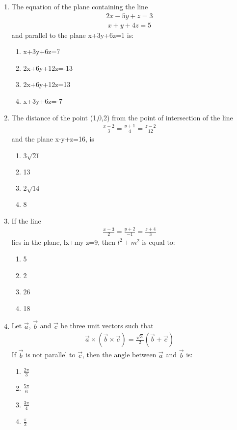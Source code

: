 \begin{enumerate}[label=\arabic*.,ref=\thesubsection.\theenumi]
\item The equation of the plane containing the line
\begin{align*}
2x-5y+z=3
\end{align*}
\begin{align*}
x+y+4z=5
\end{align*}
and parallel to the plane x+3y+6z=1 is:
\begin{enumerate}
\item x+3y+6z=7
\item 2x+6y+12z=-13
\item 2x+6y+12z=13
\item x+3y+6z=-7
\end{enumerate}

\item The distance of the point (1,0,2) from the point of intersection of the line 
\begin{align*}
\frac{x-2}{3}=\frac{y+1}{4}=\frac{z-2}{12}
\end{align*}
and the plane x-y+z=16, is
\begin{enumerate}
\item $3\sqrt{21}$
\item 13
\item $2\sqrt{14}$
\item 8
\end{enumerate}

\item If the line 
\begin{align*}
\frac{x-3}{2}=\frac{y+2}{-1}=\frac{z+4}{3}
\end{align*}
lies in the plane, lx+my-z=9, then $l^2+m^2$ is equal to:
\begin{enumerate}
\item 5
\item 2
\item 26
\item 18
\end{enumerate}

\item Let $\overrightarrow{a}$, $\overrightarrow{b}$ and $\overrightarrow{c}$ be three unit vectors such that
\begin{align*}
\overrightarrow{a} \times (\overrightarrow{b} \times \overrightarrow{c})=\frac{\sqrt{3}}{2}(\overrightarrow{b}+\overrightarrow{c})
\end{align*}
If $\overrightarrow{b}$ is not parallel to $\overrightarrow{c}$, then the angle between $\overrightarrow{a}$ and $\overrightarrow{b}$ is:
\begin{enumerate}
\item $\frac{2\pi}{3}$
\item $\frac{5\pi}{6}$
\item $\frac{3\pi}{4}$
\item $\frac{\pi}{2}$
\end{enumerate}


\end{enumerate}
